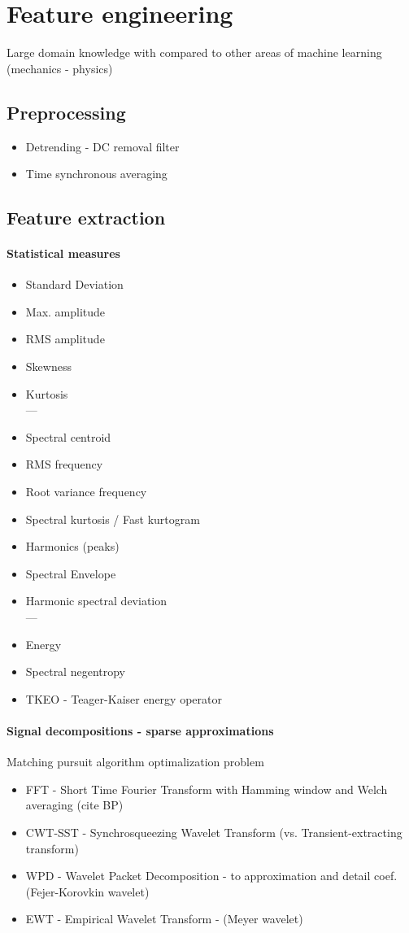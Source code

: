\section{Feature engineering}
Large domain knowledge with compared to other areas of machine learning (mechanics - physics)
\subsection{Preprocessing}
\begin{itemize}
\item Detrending - DC removal filter
\item Time synchronous averaging
\end{itemize}

\subsection{Feature extraction}

\paragraph{Statistical measures}
\begin{itemize}
\item Standard Deviation
\item Max. amplitude
\item RMS amplitude
\item Skewness
\item Kurtosis \\
---
\item Spectral centroid
\item RMS frequency
\item Root variance frequency
\item Spectral kurtosis / Fast kurtogram
\item Harmonics (peaks)
\item Spectral Envelope
\item Harmonic spectral deviation \\
---
\item Energy
\item Spectral negentropy
\item TKEO - Teager-Kaiser energy operator
\end{itemize}

\paragraph{Signal decompositions - sparse approximations}
Matching pursuit algorithm optimalization problem
\begin{itemize}
\item FFT - Short Time Fourier Transform with Hamming window and Welch averaging (cite BP)
\item CWT-SST - Synchrosqueezing Wavelet Transform (vs. Transient-extracting transform)
\item WPD - Wavelet Packet Decomposition  - to approximation and detail coef. (Fejer-Korovkin wavelet)
\item EWT - Empirical Wavelet Transform - (Meyer wavelet) 
\end{itemize}


